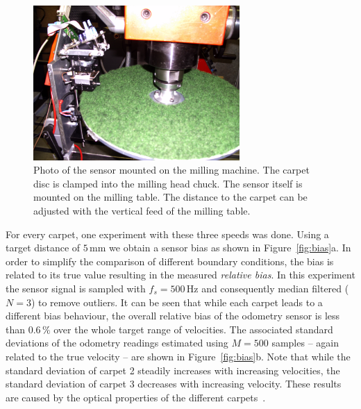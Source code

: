 \documentclass[12pt,a4paper]{article}
\begin{document}
\begin{figure}[htbp]
\begin{center}
\includegraphics[width=0.7\textwidth]{figures/pict0018.jpg}
\caption{\label{fig:pict0018}
Photo of the sensor mounted on the milling machine.
The carpet disc is clamped into the milling head chuck.
The sensor itself is mounted on the milling table.
The distance to the carpet can be adjusted with the vertical feed of the milling table.
}
\end{center}
\end{figure}

For every carpet, one experiment with these three speeds was done. 
Using a target distance of $5\,$mm we obtain a sensor bias as shown in Figure~\ref{fig:bias}a. 
In order to simplify the comparison of different boundary conditions, the bias is related to its true value resulting in the measured {\sl relative bias}. 
In this experiment the sensor signal is sampled with $f_s=500\,$Hz and consequently median filtered ($N=3$) to remove outliers.
It can be seen that while each carpet leads to a different bias behaviour, the overall relative bias of the odometry sensor is less than $0.6\,\%$ over the whole target range of velocities. 
The associated standard deviations of the odometry readings estimated using $M=500$ samples -- again related to the true velocity -- are shown in Figure~\ref{fig:bias}b. 
Note that while the standard deviation of carpet 2 steadily increases with increasing velocities, the standard deviation
of carpet 3 decreases with increasing velocity. These results are caused by the optical properties of the different carpets~\cite{i2mtc}.
\end{document}
